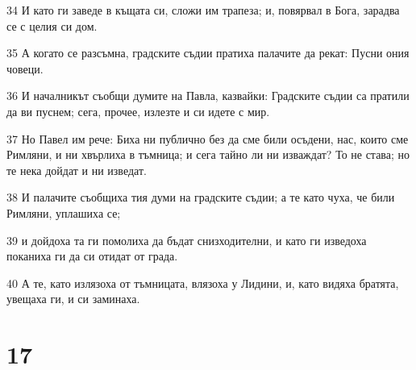 \par 34 И като ги заведе в къщата си, сложи им трапеза; и, повярвал в Бога, зарадва се с целия си дом.
\par 35 А когато се разсъмна, градските съдии пратиха палачите да рекат: Пусни ония човеци.
\par 36 И началникът съобщи думите на Павла, казвайки: Градските съдии са пратили да ви пуснем; сега, прочее, излезте и си идете с мир.
\par 37 Но Павел им рече: Биха ни публично без да сме били осъдени, нас, които сме Римляни, и ни хвърлиха в тъмница; и сега тайно ли ни изваждат? То не става; но те нека дойдат и ни изведат.
\par 38 И палачите съобщиха тия думи на градските съдии; а те като чуха, че били Римляни, уплашиха се;
\par 39 и дойдоха та ги помолиха да бъдат снизходителни, и като ги изведоха поканиха ги да си отидат от града.
\par 40 А те, като излязоха от тъмницата, влязоха у Лидини, и, като видяха братята, увещаха ги, и си заминаха.

\chapter{17}

